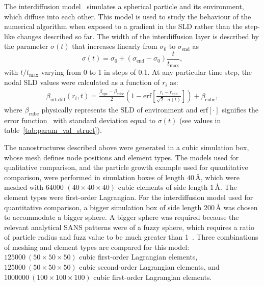 \documentclass[preprint, 5p, times, twocolumn]{elsarticle}
\begin{document}
The interdiffusion model~\cite{stieger2004are} simulates a spherical particle and its environment, which diffuse into each other. This model is used to study the behaviour of the numerical algorithm when exposed to a gradient in the SLD rather than the step-like changes described so far. The width of the interdiffusion layer is described by the parameter $\sigma(t)$ that increases linearly from $\sigma_0$ to $\sigma_{\text{end}}$ as
%
\begin{equation}
    \label{sig_fs(t)}
    \sigma(t)=\sigma_0 + (\sigma_{\text{end}}-\sigma_0)\frac{t}{t_{\text{max}}},
\end{equation}
%
with $t/t_{\text{max}}$ varying from 0 to 1 in steps of 0.1. At any particular time step, the nodal SLD values were calculated as a function of $r_i$ as:
%
\begin{equation}
\label{eqn:SLD_fs}
\begin{aligned}
    \beta_{\text{int-diff}}(r_i,t) = \frac{\beta_{\text{sph}}-\beta_{\text{cube}}}{2}\left(1-\text{erf}\left[\frac{r_i-r_{\text{sph}}}{\sqrt{2}\cdot\sigma(t)}\right]\right) +\beta_{\text{cube}},
\end{aligned}
\end{equation}
%
where $\beta_{\text{cube}}$ physically represents the SLD of environment and $\text{erf}\left[\cdot\right]$ signifies the error function~\cite{andrews1998special} with standard deviation equal to $\sigma(t)$ (see values in table~\ref{tab:param_val_struct}). 

The nanostructures described above were generated in a cubic simulation box, whose mesh defines node positions and element types. The models used for qualitative comparison, and the particle growth example used for quantitative comparison, were performed in simulation boxes of length $40$\,\AA{}, which were meshed with $64000$ $(40 \times 40 \times 40)$ cubic elements of side length $1$\,\AA{}. The element types were first-order Lagrangian. For the interdiffusion model used for quantitative comparison, a bigger simulation box of side length 200\,\AA{} was chosen to accommodate a bigger sphere. A bigger sphere was required because the relevant analytical SANS patterns were of a fuzzy sphere, which requires a ratio of particle radius and fuzz value to be much greater than 1~\cite{stieger2004are, fuzzysphereurl}. Three combinations of meshing and element types are compared for this model: $125000~(50 \times 50 \times 50)$ cubic first-order Lagrangian elements, $125000~(50 \times 50 \times 50)$ cubic second-order Lagrangian elements, and $1000000~(100 \times 100 \times 100)$ cubic first-order Lagrangian elements.
\end{document}
